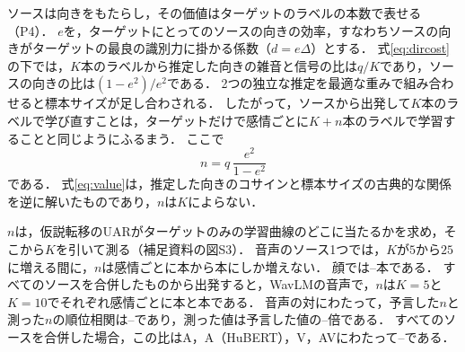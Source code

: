 ソースは向きをもたらし，その価値はターゲットのラベルの本数で表せる（P4）．
$e$を，ターゲットにとってのソースの向きの効率，すなわちソースの向きがターゲットの最良の識別力に掛かる係数（$d = e\Delta$）とする．
式\eqref{eq:dircost}の下では，$K$本のラベルから推定した向きの雑音と信号の比は$q/K$であり，ソースの向きの比は$(1 - e^2)/e^2$である．
2つの独立な推定を最適な重みで組み合わせると標本サイズが足し合わされる．
したがって，ソースから出発して$K$本のラベルで学び直すことは，ターゲットだけで感情ごとに$K + n$本のラベルで学習することと同じようにふるまう．
ここで
\begin{equation}
\label{eq:value}
n = q\,\frac{e^2}{1 - e^2}
\end{equation}
である．
式\eqref{eq:value}は，推定した向きのコサインと標本サイズの古典的な関係\cite{raudys1998intrinsic,dobriban2018highdimensional}を逆に解いたものであり，$n$は$K$によらない．

$n$は，仮説転移のUARがターゲットのみの学習曲線のどこに当たるかを求め，そこから$K$を引いて測る（補足資料の図S3）．
音声のソース1つでは，$K$が$5$から$25$に増える間に，$n$は感情ごとに本から本にしか増えない．
顔では--本である．
すべてのソースを合併したものから出発すると，WavLMの音声で，$n$は$K=5$と$K=10$でそれぞれ感情ごとに本と本である．
音声の対にわたって，予言した$n$と測った$n$の順位相関は--であり，測った値は予言した値の--倍である．
すべてのソースを合併した場合，この比はA，A（HuBERT），V，AVにわたって--である．

